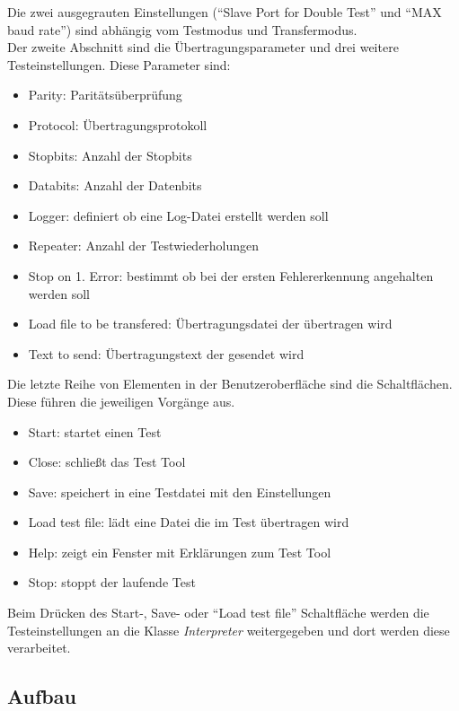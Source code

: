 Die zwei ausgegrauten Einstellungen ("`Slave Port for Double Test"' und "`MAX baud rate"') sind abhängig vom Testmodus und Transfermodus.\\

Der zweite Abschnitt sind die Übertragungsparameter und drei weitere Testeinstellungen. Diese Parameter sind:

\begin{itemize}
\item Parity: Paritätsüberprüfung
\item Protocol: Übertragungsprotokoll
\item Stopbits: Anzahl der Stopbits
\item Databits: Anzahl der Datenbits
\item Logger: definiert ob eine Log-Datei erstellt werden soll
\item Repeater: Anzahl der Testwiederholungen
\item Stop on 1. Error: bestimmt ob bei der ersten Fehlererkennung angehalten werden soll
\item Load file to be transfered: Übertragungsdatei der übertragen wird
\item Text to send: Übertragungstext der gesendet wird\\
\end{itemize}

Die letzte Reihe von Elementen in der Benutzeroberfläche sind die Schaltflächen. Diese führen die jeweiligen Vorgänge aus.

\begin{itemize}
\item Start: startet einen Test
\item Close: schließt das Test Tool
\item Save: speichert in eine Testdatei mit den Einstellungen
\item Load test file: lädt eine Datei die im Test übertragen wird
\item Help: zeigt ein Fenster mit Erklärungen zum Test Tool
\item Stop: stoppt der laufende Test\\
\end{itemize}

Beim Drücken des Start-, Save- oder "`Load test file"' Schaltfläche werden die Testeinstellungen an die Klasse \textit{Interpreter} weitergegeben und dort werden diese verarbeitet.


\subsection{Aufbau}
